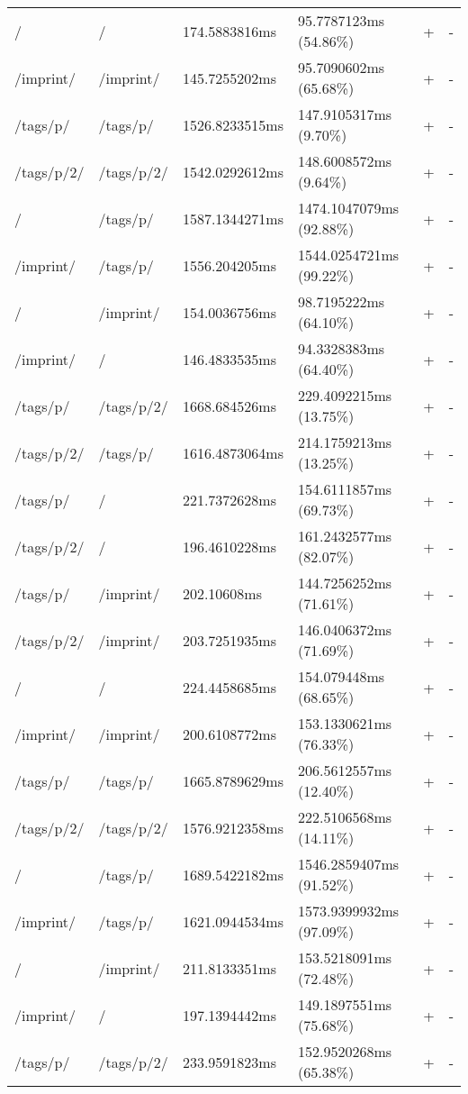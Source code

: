\begin{appendix}
\begin{center}
\begin{longtable}{llllll}
	\hline
	/ & / & 174.5883816ms & 95.7787123ms (54.86\%) & + & - \\
	/imprint/ & /imprint/ & 145.7255202ms & 95.7090602ms (65.68\%) & + & - \\
	/tags/p/ & /tags/p/ & 1526.8233515ms & 147.9105317ms (9.70\%) & + & - \\
	/tags/p/2/ & /tags/p/2/ & 1542.0292612ms & 148.6008572ms (9.64\%) & + & - \\
	\hline
	/ & /tags/p/ & 1587.1344271ms & 1474.1047079ms (92.88\%) & + & - \\
	/imprint/ & /tags/p/ & 1556.204205ms & 1544.0254721ms (99.22\%) & + & - \\
	\hline
	/ & /imprint/ & 154.0036756ms & 98.7195222ms (64.10\%) & + & - \\
	/imprint/ & / & 146.4833535ms & 94.3328383ms (64.40\%) & + & - \\
	\hline
	\hline
	/tags/p/ & /tags/p/2/ & 1668.684526ms & 229.4092215ms (13.75\%) & + & - \\
	/tags/p/2/ & /tags/p/ & 1616.4873064ms & 214.1759213ms (13.25\%) & + & - \\
	\hline
	/tags/p/ & / & 221.7372628ms & 154.6111857ms (69.73\%) & + & - \\
	/tags/p/2/ & / & 196.4610228ms & 161.2432577ms (82.07\%) & + & - \\
	/tags/p/ & /imprint/ & 202.10608ms & 144.7256252ms (71.61\%) & + & - \\
	/tags/p/2/ & /imprint/ & 203.7251935ms & 146.0406372ms (71.69\%) & + & - \\
	\hline
	/ & / & 224.4458685ms & 154.079448ms (68.65\%) & + & - \\
	/imprint/ & /imprint/ & 200.6108772ms & 153.1330621ms (76.33\%) & + & - \\
	/tags/p/ & /tags/p/ & 1665.8789629ms & 206.5612557ms (12.40\%) & + & - \\
	/tags/p/2/ & /tags/p/2/ & 1576.9212358ms & 222.5106568ms (14.11\%) & + & - \\
	\hline
	/ & /tags/p/ & 1689.5422182ms & 1546.2859407ms (91.52\%) & + & - \\
	/imprint/ & /tags/p/ & 1621.0944534ms & 1573.9399932ms (97.09\%) & + & - \\
	\hline
	/ & /imprint/ & 211.8133351ms & 153.5218091ms (72.48\%) & + & - \\
	/imprint/ & / & 197.1394442ms & 149.1897551ms (75.68\%) & + & - \\
	\hline
	\hline
	/tags/p/ & /tags/p/2/ & 233.9591823ms & 152.9520268ms (65.38\%) & + & - \\

\end{longtable}
\end{center}
\end{appendix}
